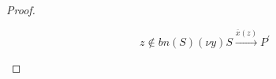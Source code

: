 \begin{proof}
\begin{description}
\begin{itemize}
\begin{description}
\[{		  z\notin bn(S)
	      }{
		(\nu y) S \xrightarrow{\overline{x}(z)} P^{'}
	      }
	    \]
	\end{description}

































































































	\end{itemize}
    \end{description}
  \end{proof}










